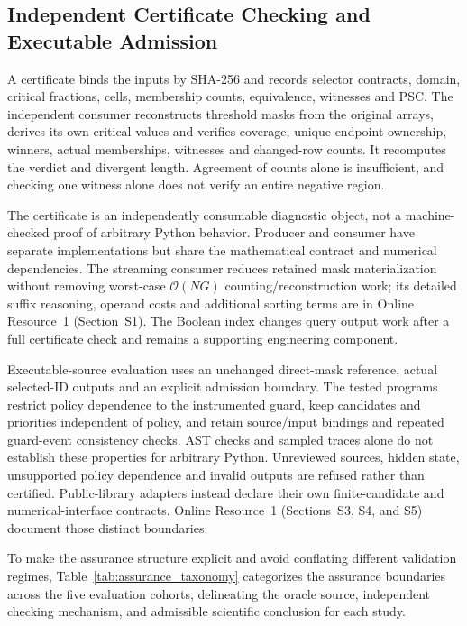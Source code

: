 \documentclass[11pt,a4paper]{article}
\begin{document}
\subsection{Independent Certificate Checking and Executable Admission}\label{subsec:cert}

A certificate binds the inputs by SHA-256 and records selector contracts, domain, critical fractions, cells, membership counts, equivalence, witnesses and PSC. The independent consumer reconstructs threshold masks from the original arrays, derives its own critical values and verifies coverage, unique endpoint ownership, winners, actual memberships, witnesses and changed-row counts. It recomputes the verdict and divergent length. Agreement of counts alone is insufficient, and checking one witness alone does not verify an entire negative region.

The certificate is an independently consumable diagnostic object, not a machine-checked proof of arbitrary Python behavior. Producer and consumer have separate implementations but share the mathematical contract and numerical dependencies. The streaming consumer reduces retained mask materialization without removing worst-case $\mathcal{O}(NG)$ counting/reconstruction work; its detailed suffix reasoning, operand costs and additional sorting terms are in Online Resource~1 (Section~S1). The Boolean index changes query output work after a full certificate check and remains a supporting engineering component.

Executable-source evaluation uses an unchanged direct-mask reference, actual selected-ID outputs and an explicit admission boundary. The tested programs restrict policy dependence to the instrumented guard, keep candidates and priorities independent of policy, and retain source/input bindings and repeated guard-event consistency checks. AST checks and sampled traces alone do not establish these properties for arbitrary Python. Unreviewed sources, hidden state, unsupported policy dependence and invalid outputs are refused rather than certified. Public-library adapters instead declare their own finite-candidate and numerical-interface contracts. Online Resource~1 (Sections~S3, S4, and S5) document those distinct boundaries.

To make the assurance structure explicit and avoid conflating different validation regimes, Table~\ref{tab:assurance_taxonomy} categorizes the assurance boundaries across the five evaluation cohorts, delineating the oracle source, independent checking mechanism, and admissible scientific conclusion for each study.
\end{document}
